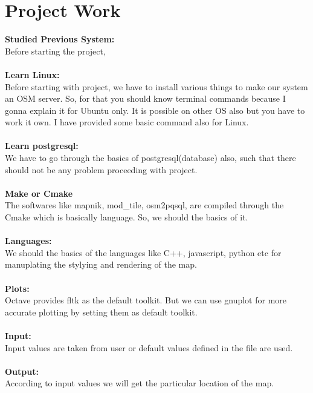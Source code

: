 \section{Project Work} 
\textbf{Studied Previous System:}\\
Before starting the project, \\\\
\textbf{Learn Linux:}\\
Before starting with project, we have to install various things to make our system an OSM server. So, for that you should know terminal commands because I gonna explain it for Ubuntu only. It is possible on other OS also but you have to work it own. I have provided some basic command also for Linux. \\\\

\textbf{Learn postgresql:}\\
 We have to go through the basics of postgresql(database) also, such that there
should not be any problem proceeding with project.\\\\
\textbf{Make or Cmake}\\
The softwares like mapnik, mod\_tile, osm2pqsql, are compiled through the Cmake which is basically language. So, we should the basics of it.
\\\\
\textbf{Languages:}\\
We should the basics of the languages like C++, javascript, python etc for manuplating the stylying and rendering of the map.\\\\
\textbf{Plots:}\\
Octave provides fltk as the default toolkit. But we can use gnuplot for more accurate plotting by setting them as default toolkit.\\\\
\textbf{Input:}\\
Input values are taken from user or default values defined in the file are used.\\\\
\textbf{Output:}\\
According to input values we will get the particular location of the map.

